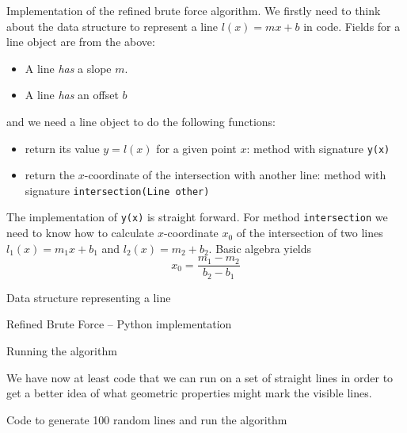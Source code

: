 \documentclass[ignorenonframetext,]{beamer}
\begin{document}
\begin{frame}{Implementation of the refined brute force algorithm.}
    We firstly need to think about the data structure to represent a
    line $l(x) = mx+b$ in code. Fields for a line object are from the
    above: 
    \begin{itemize}
    \item A line \emph{has} a slope $m$.
    \item A line \emph{has} an offset $b$
    \end{itemize}
    and we need a line object to do the following functions:
    \begin{itemize}
    \item return its value $y = l(x)$ for a given point $x$: method with signature \texttt{y(x)}
    \item return the $x$-coordinate of the intersection with another line: method with signature \texttt{intersection(Line other)}
    \end{itemize}
    The implementation of \texttt{y(x)} is straight forward. For
    method \texttt{intersection} we need to know how to calculate
    $x$-coordinate $x_0$ of the 
    intersection of two lines $l_1(x) = m_1x + b_1$ and $l_2(x) = m_2 +
    b_2$. Basic algebra yields
    \begin{equation}
      x_0 = \frac{m_1 - m_2}{b_2 - b_1}
    \end{equation}
\end{frame}

\begin{frame}{Data structure representing a line}

\tiny

\end{frame}

\begin{frame}{Refined Brute Force -- Python implementation}
\tiny

\end{frame}

\begin{frame}{Running the algorithm}

We have now at least code that we can run on a set of straight lines
in order to get a better idea of what geometric properties might mark
the visible lines.

\begin{block}{Code to generate 100 random lines and run the algorithm}
\tiny

\end{block}
\end{frame}
\end{document}
